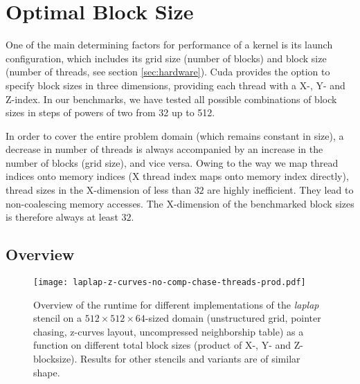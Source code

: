 \section{Optimal Block Size} \label{sec:res-blocksize}



One of the main determining factors for performance of a kernel is its launch configuration, which includes its grid size (number of blocks) and block size (number of threads, see section \ref{sec:hardware}). Cuda provides the option to specify block sizes in three dimensions, providing each thread with a X-, Y- and Z-index. In our benchmarks, we have tested all possible combinations of block sizes in steps of powers of two from 32 up to 512.

In order to cover the entire problem domain (which remains constant in size), a decrease in number of threads is always accompanied by an increase in the number of blocks (grid size), and vice versa. Owing to the way we map thread indices onto memory indices (X thread index maps onto memory index directly), thread sizes in the X-dimension of less than $32$ are highly inefficient. They lead to non-coalescing memory accesses. The X-dimension of the benchmarked block sizes is therefore always at least $32$.

\subsection{Overview}

\begin{figure}
	\texttt{[image: laplap-z-curves-no-comp-chase-threads-prod.pdf]}
	\caption{\label{fig:blocksizes-overview} Overview of the runtime for different implementations of the \emph{laplap} stencil on a $512\times 512\times 64$-sized domain (unstructured grid, pointer chasing, z-curves layout, uncompressed neighborship table) as a function on different total block sizes (product of X-, Y- and Z-blocksize). Results for other stencils and variants are of similar shape.}
\end{figure}


